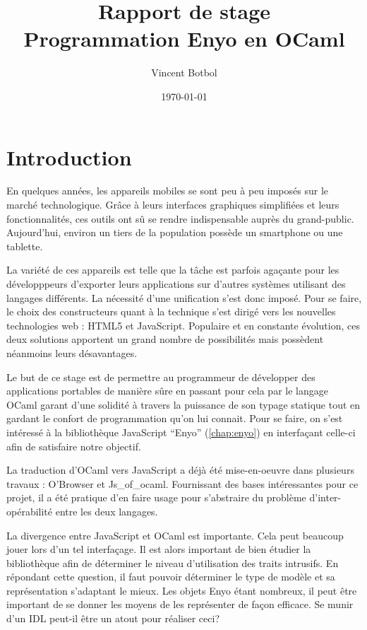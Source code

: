\documentclass[11pt,a4paper]{report}
\title{Rapport de stage\\Programmation Enyo en OCaml}
\author{Vincent Botbol}
\date\today
\begin{document}
\maketitle
\tableofcontents

\chapter{Introduction}

En quelques années, les appareils mobiles se sont peu à peu imposés sur le marché technologique.
Grâce à leurs interfaces graphiques simplifiées et leurs fonctionnalités, ces outils ont sû se 
rendre indispensable auprès du grand-public.
Aujourd'hui, environ un tiers de la population possède un smartphone ou une tablette.

La variété de ces appareils est telle que la tâche est parfois agaçante pour les développpeurs 
d'exporter leurs applications sur d'autres systèmes utilisant des langages différents.
La nécessité d'une unification s'est donc imposé. Pour se faire, le choix des constructeurs quant à
la technique s'est dirigé vers les nouvelles technologies web :
HTML5 et JavaScript. Populaire et en constante évolution, ces deux solutions apportent un grand nombre
de possibilités mais possèdent néanmoins leurs désavantages.

Le but de ce stage est de permettre au programmeur de développer des applications portables de manière sûre
en passant pour cela par le langage OCaml garant d'une solidité à travers la puissance de son typage statique
tout en gardant le confort de programmation qu'on lui connait.
Pour se faire, on s'est intéressé à la bibliothèque JavaScript ``Enyo'' (\ref{chap:enyo}) 
en interfaçant celle-ci afin de satisfaire notre objectif.

La traduction d'OCaml vers JavaScript a déjà été mise-en-oeuvre dans plusieurs travaux : O'Browser
et Js\_of\_ocaml. Fournissant des bases intéressantes pour ce projet, il a été pratique d'en faire usage
pour s'abstraire du problème d'inter-opérabilité entre les deux langages.

La divergence entre JavaScript et OCaml est importante. Cela peut beaucoup jouer lors d'un tel 
interfaçage. Il est alors important de bien étudier la bibliothèque afin de déterminer le niveau
d'utilisation des traits intrusifs.
En répondant cette question, il faut pouvoir déterminer le type de modèle et sa représentation
s'adaptant le mieux.
Les objets Enyo étant nombreux, il peut être important de se donner les moyens de les représenter 
de façon efficace. Se munir d'un IDL peut-il être un atout pour réaliser ceci?
\end{document}

